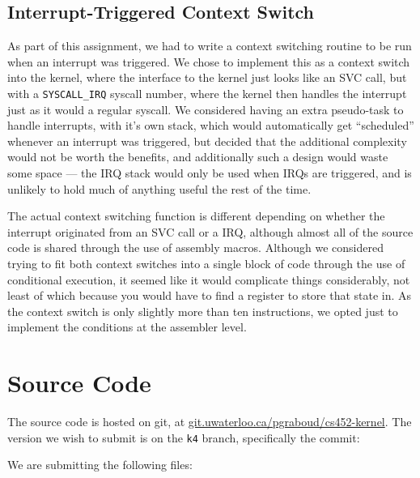 \documentclass[titlepage]{article}
\begin{document}
\subsection{Interrupt-Triggered Context Switch}
As part of this assignment, we had to write a context switching
routine to be run when an interrupt was triggered.
We chose to implement this as a context switch into the kernel, where the interface to the kernel just looks
like an SVC call, but with a \texttt{SYSCALL\_IRQ} syscall number, where the kernel then
handles the interrupt just as it would a regular syscall. We considered having
an extra pseudo-task to handle interrupts, with it's own stack, which would
automatically get ``scheduled'' whenever an interrupt was triggered, but decided
that the additional complexity would not be worth the benefits, and additionally
such a design would waste some space --- the IRQ stack would only be used when
IRQs are triggered, and is unlikely to hold much of anything useful the rest
of the time.

The actual context switching function is different depending on whether the
interrupt originated from an SVC call or a IRQ, although almost all of the
source code is shared through the use of assembly macros. Although we considered
trying to fit both context switches into a single block of code through the use
of conditional execution, it seemed like it would complicate things
considerably, not least of which because you would have to find a register to
store that state in. As the context switch is only slightly more than ten
instructions, we opted just to implement the conditions at the assembler level.


\section{Source Code}
The source code is hosted on git, at \url{git.uwaterloo.ca/pgraboud/cs452-kernel}.
The version we wish to submit is on the \texttt{k4} branch, specifically
the commit:

We are submitting the following files:


\end{document}
